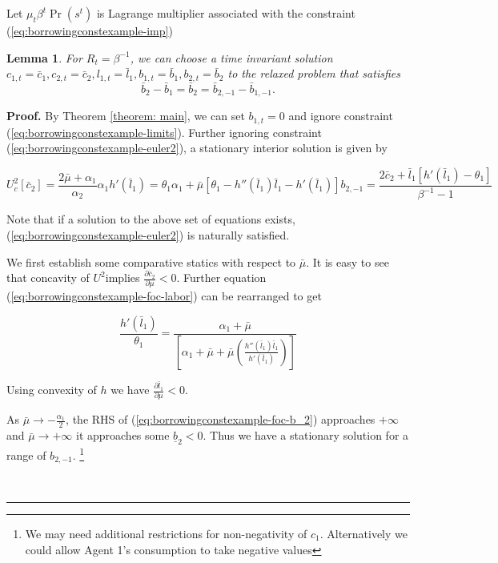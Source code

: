 \documentclass[thmsb,11pt]{article}
\newtheorem{lemma}{Lemma}
\newenvironment{proof}[1][Proof]{\noindent \textbf{#1.} }{\  \rule{0.5em}{0.5em}}
\begin{document}
Let $\mu_t\beta^t \Pr(s^t)$ is Lagrange multiplier associated with the constraint (\ref{eq:borrowingconstexample-imp})
 \begin{lemma}
 For $R_t=\beta^{-1}$, we can choose a  time invariant solution  $c_{1,t}= \bar{c}_{1},c_{2,t}=\bar{c}_{2},l_{1,t}=\bar{l}%
_{1},b_{1,t}=\bar{b}_{1},b_{2,t}=\bar{b}_{2}$ to the relaxed problem that satisfies
\begin{equation*}
\bar{b}_{2}-\bar{b}_{1}=\bar{b}_{2}=\bar{b}_{2,-1}-\bar{b}_{1,-1}.
\end{equation*}

\end{lemma}
\begin{proof}
  By Theorem \ref {theorem: main}, we can set $b_{1,t}=0$  and ignore constraint (\ref{eq:borrowingconstexample-limits}). Further ignoring constraint (\ref{eq:borrowingconstexample-euler2}), a stationary interior solution is given by

 \begin{subequations}
 \begin{equation}
  \label{eq:borrowingconstexample-foc-c2}
U^2_c[\bar{c}_2]=\frac{2\bar{\mu}+\alpha_1}{\alpha_2}
 \end{equation}
\begin{equation}
\label{eq:borrowingconstexample-foc-labor}
\alpha_1 h'(\bar{l}_1)=\theta_1\alpha_1+\bar{\mu}[\theta_1-h''(\bar{l}_1)\bar{l}_1-h'(\bar{l}_1)]
 \end{equation}
\begin{equation}
\label{eq:borrowingconstexample-foc-b_2}
b_{2,-1}=\frac{2\bar{c}_2+ \bar{l}_1\left[h'(\bar{l}_1)-\theta_1 \right] }{\beta^{-1}-1}
\end{equation}

 \end{subequations}


Note that if a solution to the above set of equations exists, (\ref{eq:borrowingconstexample-euler2}) is naturally satisfied.

We first establish some comparative statics with respect to $\bar{\mu}$. It is easy to see that concavity of $U^2$implies $\frac{\partial \bar{c}_2}{\partial \mu}<0$. Further equation (\ref{eq:borrowingconstexample-foc-labor}) can be rearranged to get

 \[\frac{h'(\bar{l}_1)}{\theta_1}=\frac{\alpha_1+\bar{\mu}}{\left[\alpha_1+\bar{\mu}+\bar{\mu}\left(\frac{h''(\bar{l}_1)\bar{l}_1}{h'(\bar{l}_1)}\right)\right]}\]

 Using convexity of $h$ we have $\frac{\partial \bar{l}_1}{\partial \mu}<0$.

 As $\bar{\mu}\to -\frac{\alpha_1}{2}$, the RHS of (\ref{eq:borrowingconstexample-foc-b_2}) approaches $+\infty$ and $\bar{\mu}\to + \infty$ it approaches some $\underline{b}_2<0$. Thus we have a stationary solution for a range of $b_{2,-1}$. \footnote{We may need additional restrictions for non-negativity of $c_1$. Alternatively we could allow Agent 1's consumption to take negative values }

\end{proof}
\end{document}

